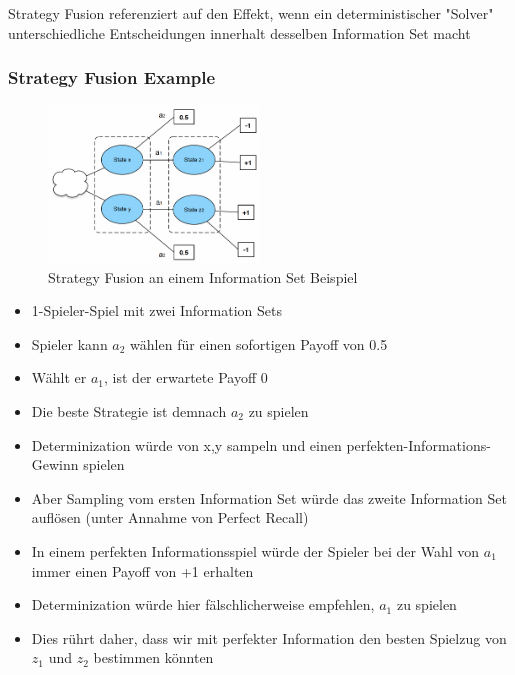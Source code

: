 \documentclass[a4paper]{article}
\begin{document}
		Strategy Fusion referenziert auf den Effekt, wenn ein deterministischer "Solver" unterschiedliche Entscheidungen innerhalt desselben Information Set macht
		
			\subsubsection{Strategy Fusion Example}
			
			\begin{figure}[htb!]
				\centering
				\includegraphics[width=0.5\textwidth]{img/03_information_sets/strategy_fusion.png}
				\caption{Strategy Fusion an einem Information Set Beispiel}
				\label{fig:03_infoset_strategy_fusion}
			\end{figure}
		
			\begin{itemize}
				\item 1-Spieler-Spiel mit zwei Information Sets
				\item Spieler kann $a_{2}$ wählen für einen sofortigen Payoff von 0.5
				\item Wählt er $a_{1}$, ist der erwartete Payoff 0
				\item Die beste Strategie ist demnach $a_{2}$ zu spielen
				\item Determinization würde von {x,y} sampeln und einen perfekten-Informations-Gewinn spielen
				\item Aber Sampling vom ersten Information Set würde das zweite Information Set auflösen (unter Annahme von Perfect Recall)
				\item In einem perfekten Informationsspiel würde der Spieler bei der Wahl von $a_{1}$ immer einen Payoff von +1 erhalten
				\item Determinization würde hier fälschlicherweise empfehlen, $a_{1}$ zu spielen
				\item Dies rührt daher, dass wir mit perfekter Information den besten Spielzug von $z_{1}$ und $z_{2}$ bestimmen könnten
			\end{itemize}
		
\end{document}
